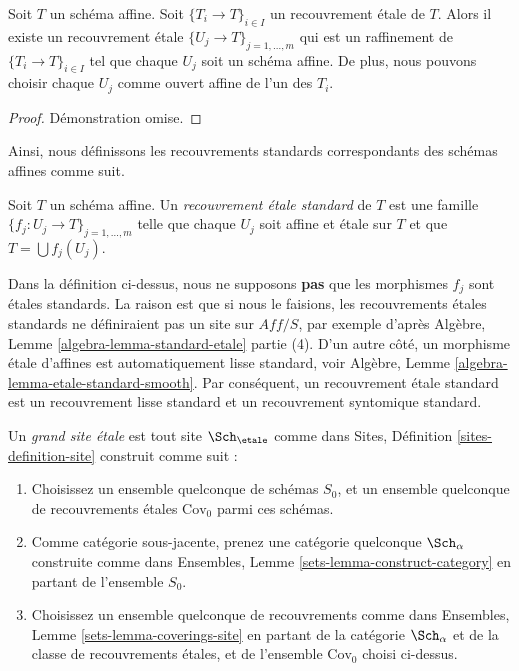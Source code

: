 \begin{lemma}
\label{lemma-etale-affine}
Soit $T$ un schéma affine. Soit $\{T_i \to T\}_{i \in I}$ un recouvrement étale de $T$. Alors il existe un recouvrement étale $\{U_j \to T\}_{j = 1, \ldots, m}$ qui est un raffinement de $\{T_i \to T\}_{i \in I}$ tel que chaque $U_j$ soit un schéma affine. De plus, nous pouvons choisir chaque $U_j$ comme ouvert affine de l'un des $T_i$.
\end{lemma}

\begin{proof}
Démonstration omise.
\end{proof}

\noindent
Ainsi, nous définissons les recouvrements standards correspondants des schémas affines comme suit.

\begin{definition}
\label{definition-standard-etale}
Soit $T$ un schéma affine. Un {\it recouvrement étale standard} de $T$ est une famille $\{f_j : U_j \to T\}_{j = 1, \ldots, m}$ telle que chaque $U_j$ soit affine et étale sur $T$ et que $T = \bigcup f_j(U_j)$.
\end{definition}

\noindent
Dans la définition ci-dessus, nous ne supposons {\bf pas} que les morphismes $f_j$ sont étales standards. La raison est que si nous le faisions, les recouvrements étales standards ne définiraient pas un site sur $\textit{Aff}/S$, par exemple d'après Algèbre, Lemme \ref{algebra-lemma-standard-etale} partie (4). D'un autre côté, un morphisme étale d'affines est automatiquement lisse standard, voir Algèbre, Lemme \ref{algebra-lemma-etale-standard-smooth}. Par conséquent, un recouvrement étale standard est un recouvrement lisse standard et un recouvrement syntomique standard.

\begin{definition}
\label{definition-big-etale-site}
Un {\it grand site étale} est tout site $\Sch_\etale$ comme dans Sites, Définition \ref{sites-definition-site} construit comme suit :
\begin{enumerate}
\item Choisissez un ensemble quelconque de schémas $S_0$, et un ensemble quelconque de recouvrements étales $\text{Cov}_0$ parmi ces schémas.
\item Comme catégorie sous-jacente, prenez une catégorie quelconque $\Sch_\alpha$\newline construite comme dans Ensembles, Lemme \ref{sets-lemma-construct-category} en partant de l'ensemble $S_0$.
\item Choisissez un ensemble quelconque de recouvrements comme dans Ensembles, Lemme \ref{sets-lemma-coverings-site} en partant de la catégorie $\Sch_\alpha$ et de la classe de recouvrements étales, et de l'ensemble $\text{Cov}_0$ choisi ci-dessus.
\end{enumerate}
\end{definition}

